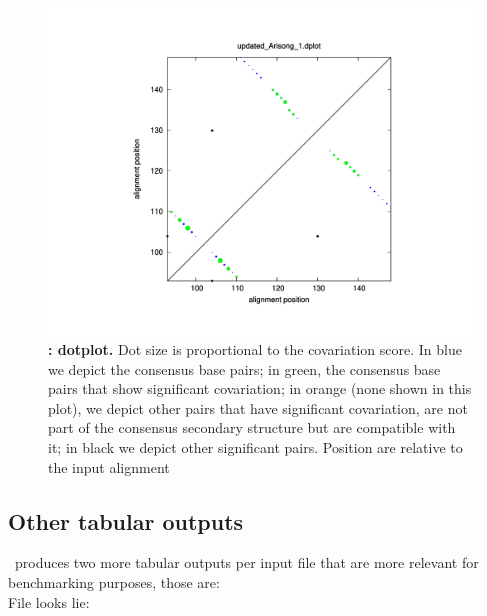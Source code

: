 \begin{figure}
  \includegraphics[scale=0.60]{Arisong_dplot.pdf}
\caption{\small\textbf{:
    dotplot.}  Dot size is proportional to the covariation score. In
  blue we depict the consensus base pairs; in green, the consensus
  base pairs that show significant covariation; in orange (none shown
  in this plot), we depict other pairs that have significant
  covariation, are not part of the consensus secondary structure but
  are compatible with it; in black we depict other significant pairs.
  Position are relative to the input alignment}
\label{fig:dplot}
\end{figure}



\clearpage
\subsection{Other tabular outputs}

\rscape\ produces two more tabular outputs per input file that are
more relevant for benchmarking purposes, those are:\\

File  looks lie:

